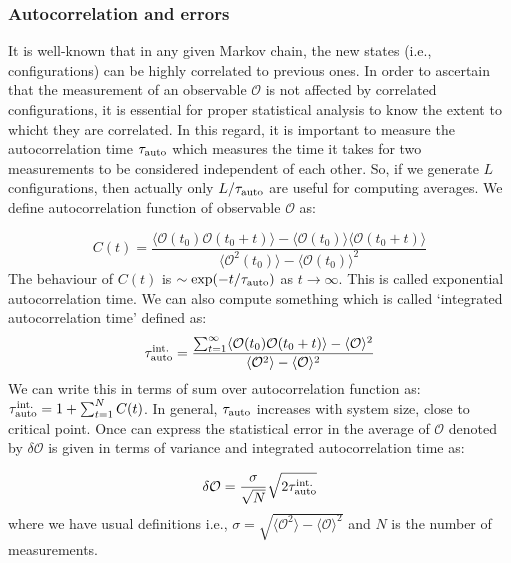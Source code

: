 \documentclass[11pt]{article}
\begin{document}

\subsubsection{Autocorrelation and errors} 

It is well-known that in any given Markov chain, the new states (i.e., configurations) can be highly correlated to previous ones. In order to ascertain that the measurement of an observable $\mathcal{O}$ is not affected by correlated configurations, it is essential for proper statistical analysis to know the extent to whicht they are
correlated. In this regard, it is important to measure
the autocorrelation time $ \tau_{\rm{auto}}$ which measures the time it takes for two measurements to be considered independent of each other. So, if we generate $L$ configurations, then actually only $L/\tau_{\rm{auto}}$ are useful for computing averages.
We define autocorrelation function of observable $\mathcal{O}$ as:
 
 \begin{equation}
 	C(t) = \frac{\langle \mathcal{O}(t_0) \mathcal{O}(t_0 + t) \rangle - \langle \mathcal{O}(t_0)\rangle \langle \mathcal{O}(t_0 + t) \rangle}{\langle \mathcal{O}^2(t_0)\rangle - \langle \mathcal{O}(t_0)\rangle^{2}}
 \end{equation}
The behaviour of $C(t)$ is $\sim \exp(-t/\tau_{\rm{auto}})$ as $ t \to \infty$. This is called exponential autocorrelation time. We can also compute something which is called `integrated autocorrelation time' defined as:
\begin{equation}
	\tau_{\rm{auto}}^{\rm{int.}} = \frac{\sum_{t=1}^{\infty} \langle \mathcal{O}(t_0) \mathcal{O}(t_0 + t) \rangle - \langle \mathcal{O} \rangle^2 }{\langle \mathcal{O}^2\rangle - \langle \mathcal{O}\rangle^{2}}
\end{equation}
We can write this in terms of sum over autocorrelation function as: $\tau_{\rm{auto}}^{\rm{int.}} = 1 + \sum_{t=1}^{N} C(t)$. In general, $ \tau_{\rm{auto}}$ increases with system size, close to critical point. Once can express the statistical error in the average of $\mathcal{O}$ denoted by $\delta \mathcal{O}$ is given in terms of variance and integrated autocorrelation time as:

\begin{equation}
	\delta \mathcal{O} = \frac{\sigma}{\sqrt{N}} \sqrt{2 \tau_{\rm{auto}}^{\rm{int.}}}
\end{equation}
where we have usual definitions i.e., 
$\sigma = \sqrt{\langle \mathcal{O}^2\rangle - \langle \mathcal{O}\rangle^{2}}$ and $N$ is the number of measurements. 
\end{document}
